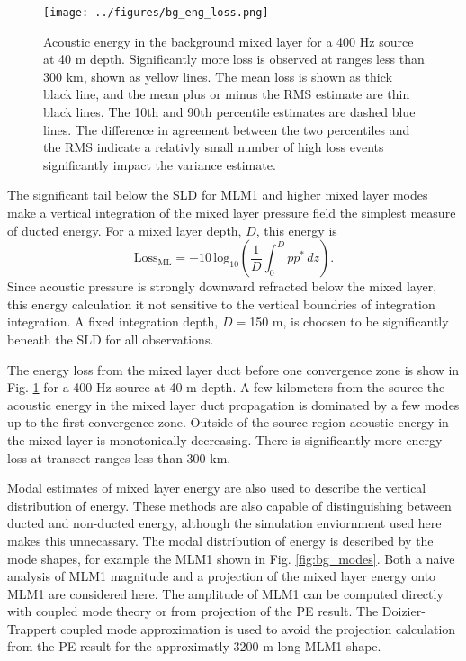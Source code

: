 \documentclass[preprint,NumberedRefs]{JASA}
\begin{document}
\begin{figure}
\texttt{[image: ../figures/bg\_eng\_loss.png]}
    \caption{Acoustic energy in the background mixed layer for a 400 Hz source at 40 m depth. Significantly more loss is observed at ranges less than 300 km, shown as yellow lines. The mean loss is shown as thick black line, and the mean plus or minus the RMS estimate are thin black lines. The 10th and 90th percentile estimates are dashed blue lines. The difference in agreement between the two percentiles and the RMS indicate a relativly small number of high loss events significantly impact the variance estimate.}
    \label{fig:bg_eng}
\end{figure}

The significant tail below the SLD for MLM1 and higher mixed layer modes make a vertical integration of the mixed layer pressure field the simplest measure of ducted energy. For a mixed layer depth, $D$, this energy is
\begin{equation}
    \textrm{Loss}_{\textrm{ML}} = -10 \, \textrm{log}_{10} \left( \frac{1}{D} \int^{D}_0 p p^* \,  dz \right).
\end{equation}
Since acoustic pressure is strongly downward refracted below the mixed layer, this energy calculation it not sensitive to the vertical boundries of integration integration. A fixed integration depth, $D=$150 m, is choosen to be significantly beneath the SLD for all observations.

The energy loss from the mixed layer duct before one convergence zone is show in Fig. \ref{fig:bg_eng} for a 400 Hz source at 40 m depth. A few kilometers from the source the acoustic energy in the mixed layer duct propagation is dominated by a few modes up to the first convergence zone. Outside of the source region acoustic energy in the mixed layer is monotonically decreasing. There is significantly more energy loss at transcet ranges less than 300 km.

Modal estimates of mixed layer energy are also used to describe the vertical distribution of energy. These methods are also capable of distinguishing between ducted and non-ducted energy, although the simulation enviornment used here makes this unnecassary. The modal distribution of energy is described by the mode shapes, for example the MLM1 shown in Fig. \ref{fig:bg_modes}. Both a naive analysis of MLM1 magnitude and a projection of the mixed layer energy onto MLM1 are considered here. The amplitude of MLM1 can be computed directly with coupled mode theory or from projection of the PE result. The Doizier-Trappert coupled mode approximation is used to avoid the projection calculation from the PE result for the approximatly 3200 m long MLM1 shape.
\end{document}
